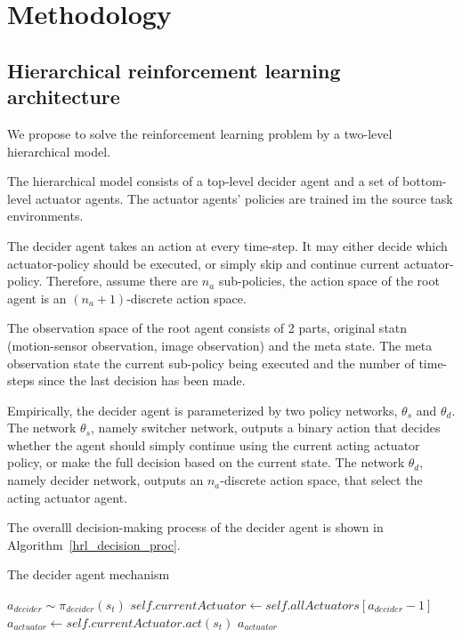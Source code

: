 \chapter{Methodology}




\section{Hierarchical reinforcement learning architecture}
We propose to solve the reinforcement learning problem by a two-level hierarchical model. 

The hierarchical model consists of a top-level decider agent and a set of bottom-level actuator agents. The actuator agents' policies are trained im the source task environments. 

The decider agent takes an action at every time-step. It may either decide which actuator-policy should be executed, or simply skip and continue current actuator-policy. Therefore, assume there are $n_a$ sub-policies, the action space of the root agent is an $(n_a+1)$-discrete action space.

The observation space of the root agent consists of 2 parts, original statn (motion-sensor observation, image observation) and the meta state. The meta observation state the current sub-policy being executed and the number of time-steps since the last decision has been made.

Empirically, the decider agent is parameterized by two policy networks, $\theta_s$ and $\theta_d$. The network $\theta_s$, namely switcher network, outputs a binary action that decides whether the agent should simply continue using the current acting actuator policy, or make the full decision based on the current state. 
The network $\theta_d$, namely decider network, outputs an $n_a$-discrete action space, that select the acting actuator agent. 

 The overalll decision-making process of the decider agent is shown in Algorithm~\ref{hrl_decision_proc}.

\begin{algorithm}
\caption{The decider agent mechanism}\label{hrl_decision_proc}
\begin{algorithmic}%
\State $a_{decider} \sim \pi_{decider}(s_t)$
 \State $self.currentActuator \gets self.allA
ctuators[a_{decider}-1]$
 \EndIf
\State $a_{actuator} \gets self.currentActuator.act(s_t)$
\State \Return $a_{actuator}$
\EndFunction
\end{algorithmic}
\end{algorithm}


